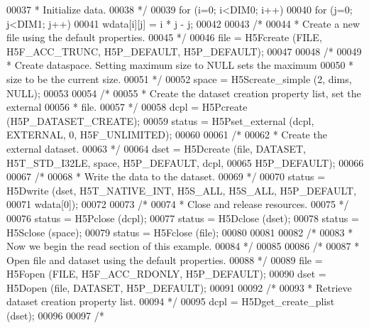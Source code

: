 \begin{DoxyCode}
00037 \textcolor{comment}{     * Initialize data.}
00038 \textcolor{comment}{     */}
00039     \textcolor{keywordflow}{for} (i=0; i<DIM0; i++)
00040         \textcolor{keywordflow}{for} (j=0; j<DIM1; j++)
00041             wdata[i][j] = i * j - j;
00042 
00043     \textcolor{comment}{/*}
00044 \textcolor{comment}{     * Create a new file using the default properties.}
00045 \textcolor{comment}{     */}
00046     file = H5Fcreate (FILE, H5F\_ACC\_TRUNC, H5P\_DEFAULT, H5P\_DEFAULT);
00047 
00048     \textcolor{comment}{/*}
00049 \textcolor{comment}{     * Create dataspace.  Setting maximum size to NULL sets the maximum}
00050 \textcolor{comment}{     * size to be the current size.}
00051 \textcolor{comment}{     */}
00052     space = H5Screate\_simple (2, dims, NULL);
00053 
00054     \textcolor{comment}{/*}
00055 \textcolor{comment}{     * Create the dataset creation property list, set the external}
00056 \textcolor{comment}{     * file.}
00057 \textcolor{comment}{     */}
00058     dcpl = H5Pcreate (H5P\_DATASET\_CREATE);
00059     status = H5Pset\_external (dcpl, EXTERNAL, 0, H5F\_UNLIMITED);
00060 
00061     \textcolor{comment}{/*}
00062 \textcolor{comment}{     * Create the external dataset.}
00063 \textcolor{comment}{     */}
00064     dset = H5Dcreate (file, DATASET, H5T\_STD\_I32LE, space, H5P\_DEFAULT, dcpl,
00065                 H5P\_DEFAULT);
00066 
00067     \textcolor{comment}{/*}
00068 \textcolor{comment}{     * Write the data to the dataset.}
00069 \textcolor{comment}{     */}
00070     status = H5Dwrite (dset, H5T\_NATIVE\_INT, H5S\_ALL, H5S\_ALL, H5P\_DEFAULT,
00071                 wdata[0]);
00072 
00073     \textcolor{comment}{/*}
00074 \textcolor{comment}{     * Close and release resources.}
00075 \textcolor{comment}{     */}
00076     status = H5Pclose (dcpl);
00077     status = H5Dclose (dset);
00078     status = H5Sclose (space);
00079     status = H5Fclose (file);
00080 
00081 
00082     \textcolor{comment}{/*}
00083 \textcolor{comment}{     * Now we begin the read section of this example.}
00084 \textcolor{comment}{     */}
00085 
00086     \textcolor{comment}{/*}
00087 \textcolor{comment}{     * Open file and dataset using the default properties.}
00088 \textcolor{comment}{     */}
00089     file = H5Fopen (FILE, H5F\_ACC\_RDONLY, H5P\_DEFAULT);
00090     dset = H5Dopen (file, DATASET, H5P\_DEFAULT);
00091 
00092     \textcolor{comment}{/*}
00093 \textcolor{comment}{     * Retrieve dataset creation property list.}
00094 \textcolor{comment}{     */}
00095     dcpl = H5Dget\_create\_plist (dset);
00096 
00097     \textcolor{comment}{/*}

\end{DoxyCode}
